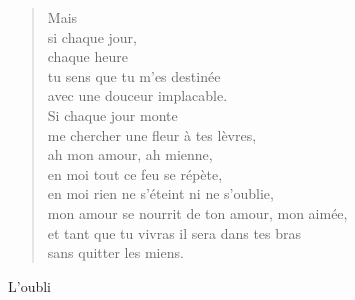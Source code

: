 \documentclass[11pt,a4paper]{book}
\begin{document}
\begin{verse}
Mais \\
si chaque jour, \\
chaque heure \\
tu sens que tu m'es destinée \\
avec une douceur implacable. \\
Si chaque jour monte \\
me chercher une fleur à tes lèvres, \\
ah mon amour, ah mienne, \\
en moi tout ce feu se répète, \\
en moi rien ne s'éteint ni ne s'oublie, \\
mon amour se nourrit de ton amour, mon aimée, \\
et tant que tu vivras il sera dans tes bras \\
sans quitter les miens.
\end{verse}

\newpage

{\huge L'oubli} \\ \\
\end{document}
